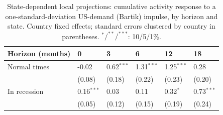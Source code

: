 \begin{table}[H]
\centering\small
\caption{State-dependent local projections: cumulative activity response to a one-standard-deviation US-demand (Bartik) impulse, by horizon and state. Country fixed effects; standard errors clustered by country in parentheses. $^{*}/^{**}/^{***}$: 10/5/1\%.}
\label{tab:lp}
\begin{tabularx}{\textwidth}{@{}lYYYYY@{}}
\toprule
Horizon (months) & 0 & 3 & 6 & 12 & 18 \\ \midrule
Normal times & -0.02 & 0.62$^{***}$ & 1.31$^{***}$ & 1.25$^{***}$ & 0.28 \\
 & (0.08) & (0.18) & (0.22) & (0.23) & (0.20) \\
In recession & 0.16$^{***}$ & 0.03 & 0.11 & 0.32$^{*}$ & 0.73$^{***}$ \\
 & (0.05) & (0.12) & (0.15) & (0.19) & (0.24) \\
\bottomrule
\end{tabularx}
\end{table}
